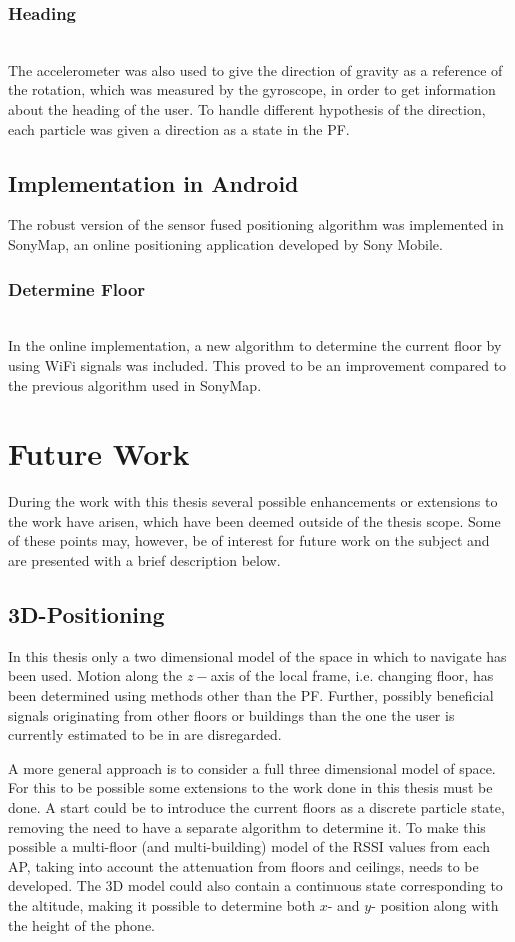 \documentclass{LTHthesis}
\begin{document}
\subsubsection{Heading} ~\\
The accelerometer was also used to give the direction of gravity as a reference of the rotation, which was measured by the gyroscope, in order to get information about the heading of the user. To handle different hypothesis of the direction, each particle was given a direction as a state in the PF.

\subsection{Implementation in Android}
The robust version of the sensor fused positioning algorithm was implemented in SonyMap, an online positioning application developed by Sony Mobile.

\subsubsection{Determine Floor} ~\\
In the online implementation, a new algorithm to determine the current floor by using WiFi signals was included. This proved to be an improvement compared to the previous algorithm used in SonyMap.

\section{Future Work}
%
During the work with this thesis several possible enhancements or extensions to the work have arisen, which have been deemed outside of the thesis scope. Some of these points may, however, be of interest for future work on the subject and are presented with a brief description below. 
%
\subsection{3D-Positioning}
%
In this thesis only a two dimensional model of the space in which to navigate has been used. Motion along the $z-$axis of the local frame, i.e. changing floor, has been determined using methods other than the PF. Further, possibly beneficial signals originating from other floors or buildings than the one the user is currently estimated to be in are disregarded.

A more general approach is to consider a full three dimensional model of space. For this to be possible some extensions to the work done in this thesis must be done. A start could be to introduce the current floors as a discrete particle state, removing the need to have a separate algorithm to determine it. To make this possible a multi-floor (and multi-building) model of the RSSI values from each AP, taking into account the attenuation from floors and ceilings, needs to be developed. The 3D model could also contain a continuous state corresponding to the altitude, making it possible to determine both $x$- and $y$- position along with the height of the phone. 
%
\end{document}

